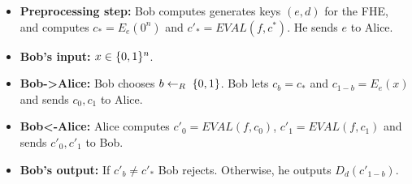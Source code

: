 \documentclass{article}
\begin{document}
\begin{itemize}[noitemsep,topsep=\mdcompacttopsep]%

\item{}\textbf{Preprocessing step:} Bob computes generates keys $(e,d)$ for the FHE, and computes $c_* = E_e(0^n)$ and $c'_*= EVAL(f,c^*)$. He sends $e$ to Alice.%

\item{}\textbf{Bob's input:} $x\in\{0,1\}^n$.%

\item{}\textbf{Bob-\textgreater{}Alice:} Bob  chooses $b\leftarrow_R\;\{0,1\}$. Bob lets $c_b = c_*$ and $c_{1-b}=E_e(x)$ and sends $c_0,c_1$ to Alice.%

\item{}\textbf{Bob\textless{}-Alice:} Alice computes $c'_0=EVAL(f,c_0)$, $c'_1=EVAL(f,c_1)$  and sends $c'_0,c'_1$ to Bob.%

\item{}\textbf{Bob's output:} If $c'_b \neq c'_*$ Bob rejects. Otherwise, he outputs $D_d(c'_{1-b})$.%
\end{itemize}%
\end{document}
